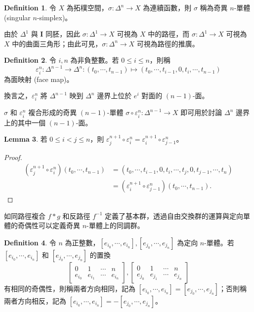 \documentclass[12pt]{article}
\theoremstyle{definition}
\newtheorem{definition}{Definition}[section]
\newtheorem{lemma}[definition]{Lemma}
\newcommand\<{\langle}
\renewcommand\>{\rangle}
\begin{document}
\begin{CJK}{UTF8}{bsmi}
\begin{definition}
    令 $X$ 為拓樸空間，$\sigma:\Delta^n\to X$ 為連續函數，則 $\sigma$ 稱為奇異 $n$-單體 (singular $n$-simplex)。
\end{definition}

由於 $\Delta^1$ 與 $\textbf{I}$ 同胚，因此 $\sigma:\Delta^1\to X$ 可視為 $X$ 中的路徑，而 $\sigma:\Delta^1\to X$ 可視為 $X$ 中的曲面三角形；由此可見，$\sigma:\Delta^n\to X$ 可視為路徑的推廣。

\begin{definition}
    令 $i, n$ 為非負整數。若 $0\le i\le n$，則稱
    \[
        \varepsilon^n_i
        :\Delta^{n-1} \to \Delta^n
        :(t_0, \cdots, t_{n-1}) \mapsto (t_0, \cdots, t_{i-1}, 0, t_i, \cdots, t_{n-1})
    \]
    為面映射 (face map)。
\end{definition}

換言之，$\varepsilon^n_i$ 將 $\Delta^{n-1}$ 映到 $\Delta^n$ 邊界上位於 $e^i$ 對面的 $(n-1)$-面。

$\sigma$ 和 $\varepsilon^n_i$ 複合形成的奇異 $(n-1)$-單體 $\sigma\circ\varepsilon^n_i:\Delta^{n-1}\to X$ 即可用於討論 $\Delta^n$ 邊界上的其中一個 $(n-1)$-面。

\begin{lemma}
\label{Commutative of face map}
    若 $0\le i<j\le n$，則 $\varepsilon^{n+1}_j\circ\varepsilon^n_i=\varepsilon^{n+1}_i\circ\varepsilon^n_{j-1}$。
\end{lemma}
\begin{proof}\begin{align*}
        (\varepsilon^{n+1}_j\circ\varepsilon^n_i)(t_0, \cdots, t_{n-1}) 
        & = (t_0, \cdots, t_{i-1}, 0, t_i, \cdots, t_j, 0, t_{j-1}, \cdots, t_n) \\
        & = (\varepsilon^{n+1}_i\circ\varepsilon^n_{j-1})(t_0, \cdots, t_{n-1}).
\end{align*}
\end{proof}

如同路徑複合 $f*g$ 和反路徑 $f^{-1}$ 定義了基本群，透過自由交換群的運算與定向單體的奇偶性可以定義奇異 $n$-單體上的同調群。

\begin{definition}
    令 $n$ 為正整數，$[e_{i_0}, \cdots, e_{i_n}], [e_{j_0}, \cdots, e_{j_n}]$ 為定向 $n$-單體。若 $[e_{i_0}, \cdots, e_{i_n}]$ 和 $[e_{j_0}, \cdots, e_{j_n}]$ 的置換 
    \[
        \begin{bmatrix}
            0 & 1 & \cdots & n \\
            e_{i_0} & e_{i_1} & \cdots & e_{i_n}
        \end{bmatrix},
        \begin{bmatrix}
            0 & 1 & \cdots & n \\
            e_{j_0} & e_{j_1} & \cdots & e_{j_n}
        \end{bmatrix}
    \]
    有相同的奇偶性，則稱兩者方向相同，記為 $[e_{i_0}, \cdots, e_{i_n}] = [e_{j_0}, \cdots, e_{j_n}]$；否則稱兩者方向相反，記為 $[e_{i_0}, \cdots, e_{i_n}]=-[e_{j_0}, \cdots, e_{j_n}]$。
\end{definition}


\end{CJK}
\end{document}
